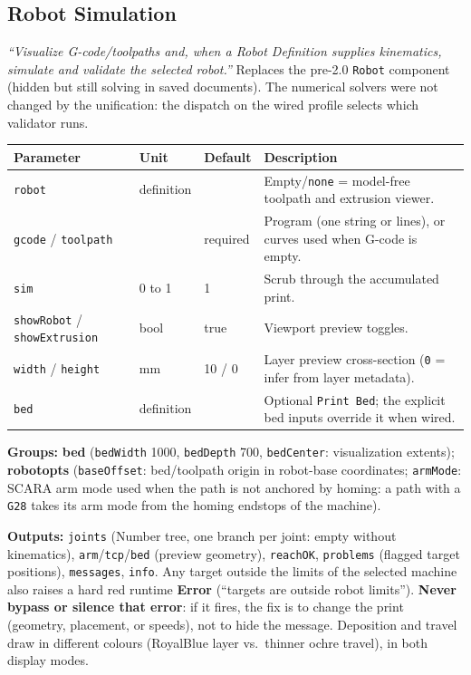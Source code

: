 \documentclass[11pt]{article}
\newcommand{\param}[1]{\texttt{#1}}
\begin{document}
\subsection{Robot Simulation}

\emph{``Visualize G-code/toolpaths and, when a Robot Definition supplies
kinematics, simulate and validate the selected robot.''} Replaces the
pre-2.0 \param{Robot} component (hidden but still solving in
saved documents). The numerical
solvers were not changed by the unification: the dispatch on the wired
profile selects which validator runs.

\begin{longtable}{@{}p{3.2cm}p{2.0cm}p{2.0cm}p{6.4cm}@{}}
\toprule
\textbf{Parameter} & \textbf{Unit} & \textbf{Default} & \textbf{Description} \\
\midrule
\endhead
\param{robot} & definition & & Empty/\param{none} = model-free toolpath and extrusion viewer. \\
\param{gcode} / \param{toolpath} & & required & Program (one string or lines), or curves used when G-code is empty. \\
\param{sim} & 0 to 1 & 1 & Scrub through the accumulated print. \\
\param{showRobot} / \param{showExtrusion} & bool & true & Viewport preview toggles. \\
\param{width} / \param{height} & mm & 10 / 0 & Layer preview cross-section (\param{0} = infer from layer metadata). \\
\param{bed} & definition & & Optional \param{Print Bed}; the explicit bed inputs override it when wired. \\
\bottomrule
\end{longtable}

\textbf{Groups:} \textbf{bed} (\param{bedWidth} 1000, \param{bedDepth}
700, \param{bedCenter}: visualization extents); \textbf{robotopts}
(\param{baseOffset}: bed/toolpath origin in robot-base coordinates;
\param{armMode}: SCARA arm mode used when the path is not anchored by
homing: a path with a \texttt{G28} takes its arm mode from the homing
endstops of the machine).

\textbf{Outputs:} \param{joints} (Number tree, one branch per joint:
empty without kinematics), \param{arm}/\param{tcp}/\param{bed} (preview
geometry), \param{reachOK}, \param{problems} (flagged target
positions), \param{messages}, \param{info}. Any target outside the limits of the selected machine also raises a hard red runtime
\textbf{Error} (``targets are outside robot limits'').
\textbf{Never bypass or silence that error}: if it fires, the fix is to
change the print (geometry, placement, or speeds), not to hide the
message. Deposition and travel draw in different colours (RoyalBlue
layer vs.\ thinner ochre travel), in both display modes.
\end{document}
